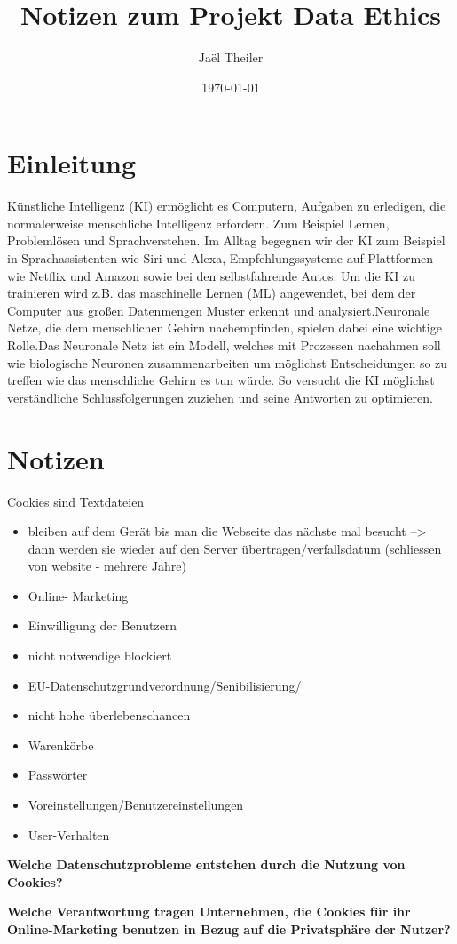 \documentclass{article}
\title{Notizen zum Projekt Data Ethics}
\author{Jaël Theiler}
\date{\today}
\begin{document}
\maketitle

\abstract{}

\tableofcontents

\section{Einleitung}
Künstliche Intelligenz (KI) ermöglicht es Computern, Aufgaben zu erledigen, die normalerweise menschliche Intelligenz erfordern. Zum Beispiel Lernen, Problemlösen und Sprachverstehen. Im Alltag begegnen wir der KI zum Beispiel in Sprachassistenten wie Siri und Alexa, Empfehlungssysteme auf Plattformen wie Netflix und Amazon sowie bei den selbstfahrende Autos.
Um die KI zu trainieren wird z.B. das maschinelle Lernen (ML) angewendet, bei dem der Computer aus großen Datenmengen Muster erkennt und analysiert.Neuronale Netze, die dem menschlichen Gehirn nachempfinden, spielen dabei eine wichtige Rolle.Das Neuronale Netz ist ein Modell, welches mit Prozessen nachahmen soll wie biologische Neuronen zusammenarbeiten um möglichst Entscheidungen so zu treffen wie das menschliche Gehirn es tun würde. So versucht die KI möglichst verständliche Schlussfolgerungen zuziehen und seine Antworten zu optimieren.

\section{Notizen}
Cookies sind Textdateien

    \begin{itemize}
        \renewcommand{\labelitemi}{$\rightarrow$}
\item bleiben auf dem Gerät bis man die Webseite das nächste mal besucht --> dann werden sie wieder auf den Server übertragen/verfallsdatum (schliessen von website - mehrere Jahre)

\item Online- Marketing
\item Einwilligung der Benutzern
\item nicht notwendige blockiert 
\item EU-Datenschutzgrundverordnung/Senibilisierung/
\item nicht hohe überlebenschancen

\item Warenkörbe
\item Passwörter
\item Voreinstellungen/Benutzereinstellungen
\item User-Verhalten

    \end{itemize}

\textbf{Welche Datenschutzprobleme entstehen durch die Nutzung von Cookies?}

\textbf{Welche Verantwortung tragen Unternehmen, die Cookies für ihr Online-Marketing benutzen in Bezug auf die Privatsphäre der Nutzer?}

\printbibliography
 
\end{document}

